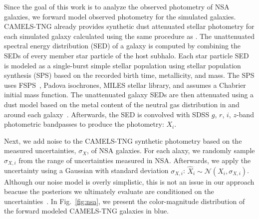 Since the goal of this work is to analyze the observed photometry of NSA
galaxies, we forward model observed photometry for the simulated galaxies. 
CAMELS-TNG already provides synthetic dust attenuated stellar photometry for
each simulated galaxy calculated using the same procedure as \cite{nelson2018}.
The unattenuated spectral energy distribution (SED) of a galaxy is computed by
combining the SEDs of every member star particle of the host subhalo. 
Each star particle SED is modeled as a single-burst simple stellar population
using stellar population synthesis (SPS) based on the recorded birth time,
metallicity, and mass. 
The SPS uses FSPS~\citep{conroy2009, conroy2010}, Padova isochrones, MILES
stellar library, and assumes a Chabrier initial mass function. 
The unattenuated galaxy SEDs are then attenuated using a dust model based on
the metal content of the neutral gas distribution in and around each
galaxy~\citep[Model C in][]{nelson2018}. 
Afterwards, the SED is convolved with SDSS $g$, $r$, $i$, $z$-band photometric
bandpasses to produce the photometry: $X_i$. 

Next, we add noise to the CAMELS-TNG synthetic photometry based on the measured
uncertainties, $\sigma_X$, of NSA galaxies. 
For each alaxy, we randomly sample $\sigma_{X,i}$ from the range of uncertainties 
measured in NSA. 
Afterwards, we apply the uncertainty using a Gaussian with standard deviation
$\sigma_{X,i}$: $\hat{X}_i \sim \mathcal{N}(X_i, \sigma_{X, i})$. 
Although our noise model is overly simplistic, this is not an issue in our
approach beacuse the posteriors we ultimately evaluate are conditioned on the
uncertainties~\citep{hahn2022a}. 
In Fig.~\ref{fig:nsa}, we present the color-magnitude distribution of the
forward modeled CAMELS-TNG galaxies in blue. 
